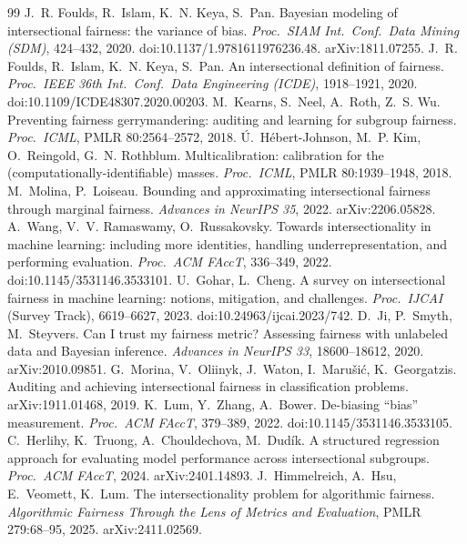 \begin{thebibliography}{99}\small
{} J.~R. Foulds, R.~Islam, K.~N. Keya, S.~Pan. Bayesian modeling of intersectional fairness: the variance of bias. \emph{Proc.\ SIAM Int.\ Conf.\ Data Mining (SDM)}, 424--432, 2020. doi:10.1137/1.9781611976236.48. arXiv:1811.07255.
 J.~R. Foulds, R.~Islam, K.~N. Keya, S.~Pan. An intersectional definition of fairness. \emph{Proc.\ IEEE 36th Int.\ Conf.\ Data Engineering (ICDE)}, 1918--1921, 2020. doi:10.1109/ICDE48307.2020.00203.
 M.~Kearns, S.~Neel, A.~Roth, Z.~S. Wu. Preventing fairness gerrymandering: auditing and learning for subgroup fairness. \emph{Proc.\ ICML}, PMLR 80:2564--2572, 2018.
 \'U.~H\'ebert-Johnson, M.~P. Kim, O.~Reingold, G.~N. Rothblum. Multicalibration: calibration for the (computationally-identifiable) masses. \emph{Proc.\ ICML}, PMLR 80:1939--1948, 2018.
 M.~Molina, P.~Loiseau. Bounding and approximating intersectional fairness through marginal fairness. \emph{Advances in NeurIPS 35}, 2022. arXiv:2206.05828.
 A.~Wang, V.~V. Ramaswamy, O.~Russakovsky. Towards intersectionality in machine learning: including more identities, handling underrepresentation, and performing evaluation. \emph{Proc.\ ACM FAccT}, 336--349, 2022. doi:10.1145/3531146.3533101.
 U.~Gohar, L.~Cheng. A survey on intersectional fairness in machine learning: notions, mitigation, and challenges. \emph{Proc.\ IJCAI} (Survey Track), 6619--6627, 2023. doi:10.24963/ijcai.2023/742.
 D.~Ji, P.~Smyth, M.~Steyvers. Can I trust my fairness metric? Assessing fairness with unlabeled data and Bayesian inference. \emph{Advances in NeurIPS 33}, 18600--18612, 2020. arXiv:2010.09851.
 G.~Morina, V.~Oliinyk, J.~Waton, I.~Maru\v{s}i\'c, K.~Georgatzis. Auditing and achieving intersectional fairness in classification problems. arXiv:1911.01468, 2019.
 K.~Lum, Y.~Zhang, A.~Bower. De-biasing ``bias'' measurement. \emph{Proc.\ ACM FAccT}, 379--389, 2022. doi:10.1145/3531146.3533105.
 C.~Herlihy, K.~Truong, A.~Chouldechova, M.~Dud\'ik. A structured regression approach for evaluating model performance across intersectional subgroups. \emph{Proc.\ ACM FAccT}, 2024. arXiv:2401.14893.
 J.~Himmelreich, A.~Hsu, E.~Veomett, K.~Lum. The intersectionality problem for algorithmic fairness. \emph{Algorithmic Fairness Through the Lens of Metrics and Evaluation}, PMLR 279:68--95, 2025. arXiv:2411.02569.

\end{thebibliography}
